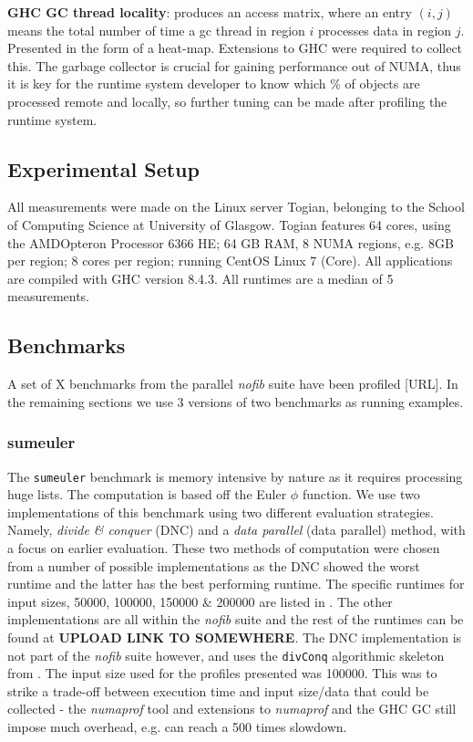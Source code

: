 \documentclass{paper}\usepackage{graphicx}
\begin{document}
\textbf{GHC GC thread locality}: produces an access matrix, where an entry $(i,j)$ means the total number of time a gc thread in region $i$ processes data in region $j$. Presented in the form of a heat-map. Extensions to GHC were required to collect this. The garbage collector is crucial for gaining performance out of NUMA, thus it is key for the runtime system developer to know which \% of objects are processed remote and locally, so further tuning can be made after profiling the runtime system.

\subsection{Experimental Setup}
\label{sec:expsetup}

All measurements were made on the Linux server Togian, belonging to the School of Computing Science at University of Glasgow. Togian features 64 cores, using the AMD\texttrademark Opteron Processor 6366 HE; 64 GB RAM, 8 NUMA regions, e.g. 8GB per region; 8 cores per region; running CentOS Linux 7 (Core). All applications are compiled with GHC version 8.4.3. All runtimes are a median of 5 measurements.

\subsection{Benchmarks}
\label{sec:benchmarks}


A set of X benchmarks from the parallel \textit{nofib} \cite{DBLP:conf/fp/Partain92} suite have been profiled [URL]. In the remaining sections we use 3 versions of two benchmarks as running examples.

\subsubsection{sumeuler}

The \lstinline{sumeuler} benchmark is memory intensive by nature as it requires processing huge lists. The computation is based off the Euler $\phi$ function. We use two implementations of this benchmark using two different evaluation strategies. Namely, \textit{divide \& conquer} (DNC) and a \textit{data parallel} (data parallel) method, with a focus on earlier evaluation. These two methods of computation were chosen from a number of possible implementations as the DNC showed the worst runtime and the latter has the best performing runtime. The specific runtimes for input sizes, 50000, 100000, 150000 \& 200000 are listed in . The other implementations are all within the \textit{nofib} suite and the rest of the runtimes can be found at \textbf{UPLOAD LINK TO SOMEWHERE}.  The DNC implementation is not part of the \textit{nofib} suite however, and uses the \lstinline{divConq} algorithmic skeleton from \cite{DBLP:conf/haskell/MarlowMLAT10}. The input size used for the profiles presented was 100000. This was to strike a trade-off between execution time and input size/data that could be collected - the \textit{numaprof} tool and extensions to \textit{numaprof} and the GHC GC still impose much overhead, e.g. can reach a 500 times slowdown.
\end{document}
